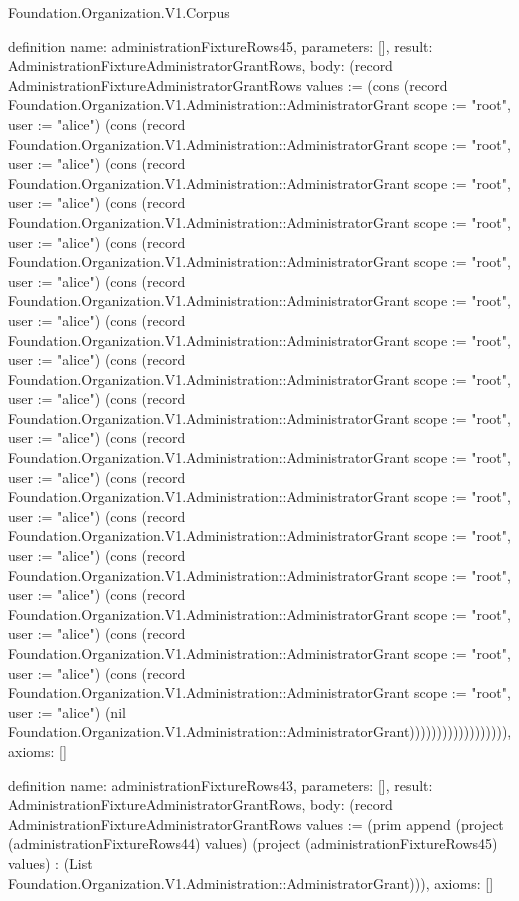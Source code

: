 \begin{lexlean}{Foundation.Organization.V1.Corpus}
\begin{semanticmodule}
definition{
  name: administrationFixtureRows45,
  parameters: [],
  result: AdministrationFixtureAdministratorGrantRows,
  body: (record AdministrationFixtureAdministratorGrantRows {values := (cons (record Foundation.Organization.V1.Administration::AdministratorGrant {scope := "root", user := "alice"}) (cons (record Foundation.Organization.V1.Administration::AdministratorGrant {scope := "root", user := "alice"}) (cons (record Foundation.Organization.V1.Administration::AdministratorGrant {scope := "root", user := "alice"}) (cons (record Foundation.Organization.V1.Administration::AdministratorGrant {scope := "root", user := "alice"}) (cons (record Foundation.Organization.V1.Administration::AdministratorGrant {scope := "root", user := "alice"}) (cons (record Foundation.Organization.V1.Administration::AdministratorGrant {scope := "root", user := "alice"}) (cons (record Foundation.Organization.V1.Administration::AdministratorGrant {scope := "root", user := "alice"}) (cons (record Foundation.Organization.V1.Administration::AdministratorGrant {scope := "root", user := "alice"}) (cons (record Foundation.Organization.V1.Administration::AdministratorGrant {scope := "root", user := "alice"}) (cons (record Foundation.Organization.V1.Administration::AdministratorGrant {scope := "root", user := "alice"}) (cons (record Foundation.Organization.V1.Administration::AdministratorGrant {scope := "root", user := "alice"}) (cons (record Foundation.Organization.V1.Administration::AdministratorGrant {scope := "root", user := "alice"}) (cons (record Foundation.Organization.V1.Administration::AdministratorGrant {scope := "root", user := "alice"}) (cons (record Foundation.Organization.V1.Administration::AdministratorGrant {scope := "root", user := "alice"}) (cons (record Foundation.Organization.V1.Administration::AdministratorGrant {scope := "root", user := "alice"}) (cons (record Foundation.Organization.V1.Administration::AdministratorGrant {scope := "root", user := "alice"}) (nil Foundation.Organization.V1.Administration::AdministratorGrant)))))))))))))))))}),
  axioms: []
}

definition{
  name: administrationFixtureRows43,
  parameters: [],
  result: AdministrationFixtureAdministratorGrantRows,
  body: (record AdministrationFixtureAdministratorGrantRows {values := (prim append (project (administrationFixtureRows44) values) (project (administrationFixtureRows45) values) : (List Foundation.Organization.V1.Administration::AdministratorGrant))}),
  axioms: []
}


\end{semanticmodule}
\end{lexlean}
